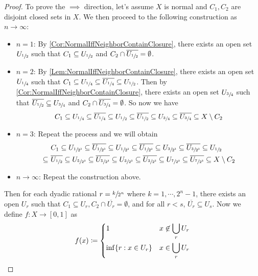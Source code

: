 \documentclass[screen,single]{techreport}
\numberwithin{equation}{section}
\begin{document}
\begin{proof}
	To prove the $\implies$ direction, let's assume $X$ is normal and $C_1,C_2$ are disjoint closed sets in $X$. We then proceed to the following construction as $n \to \infty$:
	\begin{itemize}
		\item $n=1$: By \cref{Cor:NormalIffNeighborContainClosure}, there exists an open set $U_{\sfrac{1}{2}}$ such that $C_1 \subseteq U_{\sfrac{1}{2}}$ and $C_2 \cap \overline{U_{\sfrac{1}{2}}} = \emptyset$.
		\item $n=2$: By \cref{Lem:NormalIffNeighborContainClosure}, there exists an open set $U_{\sfrac{1}{4}}$ such that $C_1 \subseteq U_{\sfrac{1}{4}} \subseteq \overline{U_{\sfrac{1}{4}}} \subseteq U_{\sfrac{1}{2}}$.
		Then by \cref{Cor:NormalIffNeighborContainClosure}, there exists an open set $U_{\sfrac{3}{4}}$ such that $\overline{U_{\sfrac{1}{2}}} \subseteq U_{\sfrac{3}{4}}$ and $C_2 \cap \overline{U_{\sfrac{3}{4}}} = \emptyset$.
		So now we have
		\[
		C_1 \subseteq U_{\sfrac{1}{4}} \subseteq \overline{U_{\sfrac{1}{4}}} \subseteq U_{\sfrac{1}{2}} \subseteq \overline{U_{\sfrac{1}{2}}} \subseteq   U_{\sfrac{3}{4}} \subseteq \overline{U_{\sfrac{3}{4}}} \subseteq X \setminus C_2
		\]
		\item $n = 3$: Repeat the process and we will obtain
		\begin{align*}
		& C_1 \subseteq U_{\sfrac{1}{2^3}} \subseteq \overline{U_{\sfrac{1}{2^3}}} \subseteq U_{\sfrac{1}{2^2}} \subseteq \overline{U_{\sfrac{1}{2^2}} } \subseteq U_{\sfrac{3}{2^3}} \subseteq \overline{U_{\sfrac{3}{2^3}}} \subseteq U_{\sfrac{1}{2}} \\
		\subseteq ~ & \overline{U_{\sfrac{1}{2}}} \subseteq U_{\sfrac{5}{2^3}} \subseteq \overline{U_{\sfrac{5}{2^3}}} \subseteq U_{\sfrac{3}{2^2}} \subseteq \overline{U_{\sfrac{3}{2^2}}} \subseteq U_{\sfrac{7}{2^3}} \subseteq \overline{U_{\sfrac{7}{2^3}}} \subseteq X \setminus C_2
		\end{align*}
		\item $n \to \infty$: Repeat the construction above.
	\end{itemize}
	Then for each dyadic rational $r = \sfrac{k}{2^n}$ where $k=1,\cdots,2^n-1$, there exists an open $U_r$ such that $C_1 \subseteq U_r, C_2 \cap \overline{U_r} = \emptyset$, and for all $r < s$, $\overline{U_r} \subseteq U_s$.
	Now we define $f : X \to [0,1]$ as
	\[
	f(x) \coloneqq \begin{dcases}
 		1 & x \not\in \bigcup_r U_r \\
 		\inf \{r : x \in U_r\} & x \in \bigcup_r U_r
	\end{dcases}
\]
\end{proof}
\end{document}
